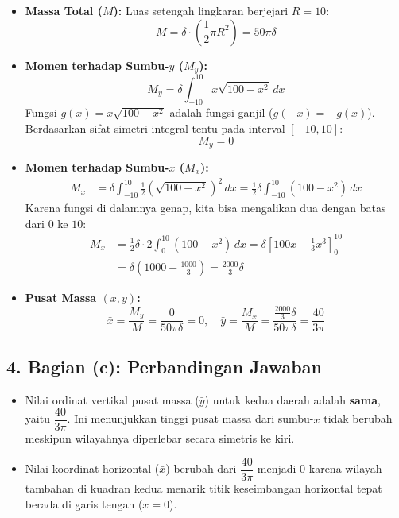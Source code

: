 \documentclass[12pt,a4paper]{article}
\begin{document}
\begin{itemize}
  \item \textbf{Massa Total ($M$):}
    Luas setengah lingkaran berjejari $R=10$:
    \begin{equation*}
      M = \delta \cdot \left(\frac{1}{2} \pi R^2\right) = 50\pi\delta
    \end{equation*}

  \item \textbf{Momen terhadap Sumbu-$y$ ($M_y$):}
    \begin{equation*}
      M_y = \delta \int_{-10}^{10} x \sqrt{100 - x^2} \, dx
    \end{equation*}
    Fungsi $g(x) = x\sqrt{100-x^2}$ adalah fungsi ganjil ($g(-x) = -g(x)$). Berdasarkan sifat simetri integral tentu pada interval $[-10, 10]$:
    \begin{equation*}
      M_y = 0
    \end{equation*}

  \item \textbf{Momen terhadap Sumbu-$x$ ($M_x$):}
    \begin{align*}
      M_x &= \delta \int_{-10}^{10} \frac{1}{2} \left(\sqrt{100 - x^2}\right)^2 \, dx = \frac{1}{2}\delta \int_{-10}^{10} (100 - x^2) \, dx
    \end{align*}
    Karena fungsi di dalamnya genap, kita bisa mengalikan dua dengan batas dari $0$ ke $10$:
    \begin{align*}
      M_x &= \frac{1}{2}\delta \cdot 2 \int_{0}^{10} (100 - x^2) \, dx = \delta \left[ 100x - \frac{1}{3}x^3 \right]_{0}^{10} \\
      &= \delta \left( 1000 - \frac{1000}{3} \right) = \frac{2000}{3}\delta
    \end{align*}

  \item \textbf{Pusat Massa $(\bar{x}, \bar{y})$:}
    \begin{equation*}
      \bar{x} = \frac{M_y}{M} = \frac{0}{50\pi\delta} = 0, \quad \bar{y} = \frac{M_x}{M} = \frac{\frac{2000}{3}\delta}{50\pi\delta} = \frac{40}{3\pi}
    \end{equation*}
\end{itemize}

\subsection*{4. Bagian (c): Perbandingan Jawaban}
\begin{itemize}
  \item Nilai ordinat vertikal pusat massa ($\bar{y}$) untuk kedua daerah adalah \textbf{sama}, yaitu $\dfrac{40}{3\pi}$. Ini menunjukkan tinggi pusat massa dari sumbu-$x$ tidak berubah meskipun wilayahnya diperlebar secara simetris ke kiri.
  \item Nilai koordinat horizontal ($\bar{x}$) berubah dari $\dfrac{40}{3\pi}$ menjadi $0$ karena wilayah tambahan di kuadran kedua menarik titik keseimbangan horizontal tepat berada di garis tengah ($x = 0$).
\end{itemize}
\end{document}

